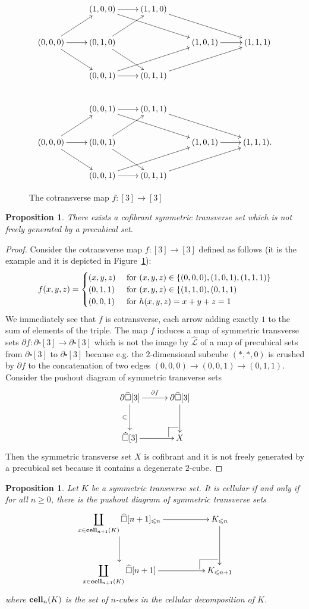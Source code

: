 \documentclass[a4paper,12pt]{amsart}
\makeatletter
\newcommand{\de}{\partial}
\newtheorem{prop}[thm]{Proposition}
\newcommand{\bp}{\begin{prop}}
\newcommand{\ep}{\end{prop}}
\newcommand{\bpf}{\begin{proof}}
\newcommand{\epf}{\end{proof}}
\theoremstyle{definition}
\newcommand{\fr}[1]{\ar@{->}[r]^-{#1}}
\newcommand{\fd}[1]{\ar@{->}[d]_-{#1}}
\renewcommand{\leq}{\leqslant}
\renewcommand{\geq}{\geqslant}
\def\cocartesien{%
	\ar@{-}[]+L+<-6pt,+2pt>;[]+LU+<-6pt,+6pt>%
	\ar@{-}[]+U+<-2pt,+6pt>;[]+LU+<-6pt,+6pt>%
}
\newcommand{\brm}[1]{{\rm{\mathbf{#1}}}}
\DeclareMathOperator{\cell}{{\brm{cell}}}
\makeatother
\begin{document}
\begin{figure}
	{\[
		\xymatrix{
			& (1,0,0) \ar@{->}[r] \ar@{->}[rrd] & (1,1,0) \ar@{->}[drr] && \\
			(0,0,0) \ar@{->}[r] \ar@{->}[ur] \ar@{->}[dr] & (0,1,0) \ar@{->}[ur]
			\ar@{->}[dr] && (1,0,1) \ar@{->}[r] &
			(1,1,1) \\
			& (0,0,1) \ar@{->}[r] \ar@{->}[rru] & (0,1,1) \ar@{->}[urr] && \\
			& (0,0,1) \ar@{->}[r] \ar@{->}[rrd] & (0,1,1) \ar@{->}[drr] && \\
			(0,0,0) \ar@{->}[r] \ar@{->}[ur] \ar@{->}[dr] & (0,0,1) \ar@{->}[ur]
			\ar@{->}[dr] && (1,0,1) \ar@{->}[r] &
			(1,1,1). \\
			& (0,0,1) \ar@{->}[r] \ar@{->}[rru] & (0,1,1) \ar@{->}[urr] && 
		}
		\] }
	\caption{The cotransverse map $f:[3]\to [3]$}
	\label{source}
\end{figure}


\bp
There exists a cofibrant symmetric transverse set which is not freely generated by a precubical set. 
\ep

\bpf
Consider the cotransverse map $f:[3]\to [3]$ defined as follows (it is the example \cite[Figure~5]{symcub} and it is depicted in Figure~\ref{source}): 
\[
f(x,y,z) = \begin{cases}
	(x,y,z) & \hbox{ for }(x,y,z)\in \{(0,0,0),(1,0,1),(1,1,1)\}\\
	(0,1,1) & \hbox{ for }(x,y,z)\in \{(1,1,0),(0,1,1)\\
	(0,0,1) & \hbox{ for } h(x,y,z) = x+y+z = 1
\end{cases}
\]
We immediately see that $f$ is cotransverse, each arrow adding exactly $1$ to the sum of elements of the triple. The map $f$ induces a map of symmetric transverse sets $\de f:\de\widehat{\square}[3]\to \de\widehat{\square}[3]$ which is not the image by $\widehat{\mathcal{L}}$ of a map of precubical sets from $\de{\square}[3]$ to $\de{\square}[3]$ because e.g. the $2$-dimensional subcube $(*,*,0)$ is crushed by $\de f$ to the concatenation of two edges $(0,0,0)\to (0,0,1) \to (0,1,1)$. Consider the pushout diagram of symmetric transverse sets 
\[
\xymatrix@C=3em@R=3em
{\de\widehat{\square}[3] \fd{\subset}\fr{\de f} & \de\widehat{\square}[3] \fd{} \\
	\widehat{\square}[3] \fr{} & \cocartesien X}
\]
Then the symmetric transverse set $X$ is cofibrant and it is not freely generated by a precubical set because it contains a degenerate $2$-cube.
\epf


\bp \label{finite_induction_cofibrant}
Let $K$ be a symmetric transverse set. It is cellular if and only if for all $n\geq 0$, there is the pushout diagram of symmetric transverse sets 
\[
\xymatrix@C=5em@R=3em
{
	\displaystyle\coprod\limits_{x\in \cell_{n+1}(K)} \widehat{\square}[n+1]_{\leq n} \fd{}\fr{} & K_{\leq n}\fd{} \\
	\displaystyle\coprod\limits_{x\in \cell_{n+1}(K)} \widehat{\square}[n+1] \fr{}  & \cocartesien K_{\leq n+1}
}
\]
where $\cell_{n}(K)$ is the set of $n$-cubes in the cellular decomposition of $K$.
\ep 
\end{document}

